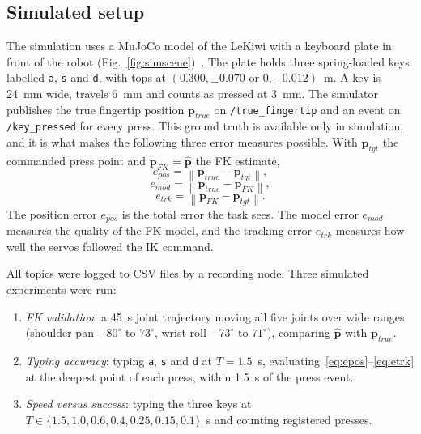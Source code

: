 \documentclass[conference]{IEEEtran}
\newcommand{\vect}[1]{\boldsymbol{#1}}
\begin{document}
\subsection{Simulated setup}
The simulation uses a MuJoCo model of the LeKiwi with a keyboard plate in front of the robot (Fig.~\ref{fig:simscene})~\cite{for26}. The plate holds three spring-loaded keys labelled \texttt{a}, \texttt{s} and \texttt{d}, with tops at $(0.300, \pm0.070\text{ or }0, -0.012)$~m. A key is 24~mm wide, travels 6~mm and counts as pressed at 3~mm. The simulator publishes the true fingertip position $\vect{p}_{true}$ on \texttt{/true\_fingertip} and an event on \texttt{/key\_pressed} for every press. This ground truth is available only in simulation, and it is what makes the following three error measures possible. With $\vect{p}_{tgt}$ the commanded press point and $\vect{p}_{FK}=\hat{\vect{p}}$ the FK estimate,
\begin{equation}
e_{pos} = \left\|\vect{p}_{true}-\vect{p}_{tgt}\right\|,
\label{eq:epos}
\end{equation}
\begin{equation}
e_{mod} = \left\|\vect{p}_{true}-\vect{p}_{FK}\right\|,
\label{eq:emod}
\end{equation}
\begin{equation}
e_{trk} = \left\|\vect{p}_{FK}-\vect{p}_{tgt}\right\|.
\label{eq:etrk}
\end{equation}
The position error $e_{pos}$ is the total error the task sees. The model error $e_{mod}$ measures the quality of the FK model, and the tracking error $e_{trk}$ measures how well the servos followed the IK command.

All topics were logged to CSV files by a recording node. Three simulated experiments were run:
\begin{enumerate}
\item \emph{FK validation}: a 45~s joint trajectory moving all five joints over wide ranges (shoulder pan $-80^\circ$ to $73^\circ$, wrist roll $-73^\circ$ to $71^\circ$), comparing $\hat{\vect{p}}$ with $\vect{p}_{true}$.
\item \emph{Typing accuracy}: typing \texttt{a}, \texttt{s} and \texttt{d} at $T=1.5$~s, evaluating~\eqref{eq:epos}--\eqref{eq:etrk} at the deepest point of each press, within 1.5~s of the press event.
\item \emph{Speed versus success}: typing the three keys at $T\in\{1.5, 1.0, 0.6, 0.4, 0.25, 0.15, 0.1\}$~s and counting registered presses.
\end{enumerate}
\end{document}
